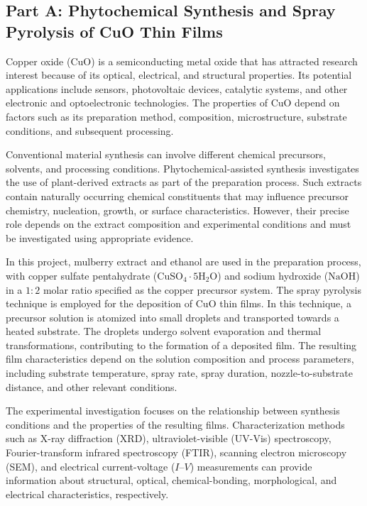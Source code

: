 \documentclass[12pt,a4paper,oneside]{report}
\begin{document}
{{{\subsection{Part A: Phytochemical Synthesis and Spray Pyrolysis of CuO Thin Films}

Copper oxide ($\text{CuO}$) is a semiconducting metal oxide that has attracted research interest because of its optical, electrical, and structural properties. Its potential applications include sensors, photovoltaic devices, catalytic systems, and other electronic and optoelectronic technologies. The properties of $\text{CuO}$ depend on factors such as its preparation method, composition, microstructure, substrate conditions, and subsequent processing.

Conventional material synthesis can involve different chemical precursors, solvents, and processing conditions. Phytochemical-assisted synthesis investigates the use of plant-derived extracts as part of the preparation process. Such extracts contain naturally occurring chemical constituents that may influence precursor chemistry, nucleation, growth, or surface characteristics. However, their precise role depends on the extract composition and experimental conditions and must be investigated using appropriate evidence.

In this project, mulberry extract and ethanol are used in the preparation process, with copper sulfate pentahydrate ($\text{CuSO}_4{\cdot}5\text{H}_2\text{O}$) and sodium hydroxide ($\text{NaOH}$) in a $1{:}2$ molar ratio specified as the copper precursor system. The spray pyrolysis technique is employed for the deposition of $\text{CuO}$ thin films. In this technique, a precursor solution is atomized into small droplets and transported towards a heated substrate. The droplets undergo solvent evaporation and thermal transformations, contributing to the formation of a deposited film. The resulting film characteristics depend on the solution composition and process parameters, including substrate temperature, spray rate, spray duration, nozzle-to-substrate distance, and other relevant conditions.

The experimental investigation focuses on the relationship between synthesis conditions and the properties of the resulting films. Characterization methods such as X-ray diffraction (XRD), ultraviolet-visible (UV-Vis) spectroscopy, Fourier-transform infrared spectroscopy (FTIR), scanning electron microscopy (SEM), and electrical current-voltage ($I\text{--}V$) measurements can provide information about structural, optical, chemical-bonding, morphological, and electrical characteristics, respectively.

}}}
\end{document}
